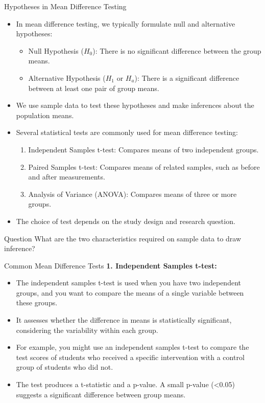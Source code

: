 \documentclass[notes,10pt, aspectratio=169]{beamer}
\begin{document}
\begin{frame}{Hypotheses in Mean Difference Testing}
\begin{itemize}
    \item In mean difference testing, we typically formulate null and alternative hypotheses:
        \begin{itemize}
            \item Null Hypothesis ($H_0$): There is no significant difference between the group means.
            \item Alternative Hypothesis ($H_1$ or $H_a$): There is a significant difference between at least one pair of group means.
        \end{itemize}
    \item We use sample data to test these hypotheses and make inferences about the population means.
    \item Several statistical tests are commonly used for mean difference testing:
        \begin{enumerate}
            \item Independent Samples t-test: Compares means of two independent groups.
            \item Paired Samples t-test: Compares means of related samples, such as before and after measurements.
            \item Analysis of Variance (ANOVA): Compares means of three or more groups.
        \end{enumerate}
    \item The choice of test depends on the study design and research question.
\end{itemize}


    \begin{exampleblock}{Question}
What are the two characteristics required on sample data to draw inference?
    \end{exampleblock}


\end{frame}



\begin{frame}{Common Mean Difference Tests}
\textbf{1. Independent Samples t-test:}
\begin{itemize}
    \item The independent samples t-test is used when you have two independent groups, and you want to compare the means of a single variable between these groups.
    \item It assesses whether the difference in means is statistically significant, considering the variability within each group.
    \item For example, you might use an independent samples t-test to compare the test scores of students who received a specific intervention with a control group of students who did not.
    \item The test produces a t-statistic and a p-value. A small p-value (<0.05) suggests a significant difference between group means.
\end{itemize}
\end{frame}
\end{document}
